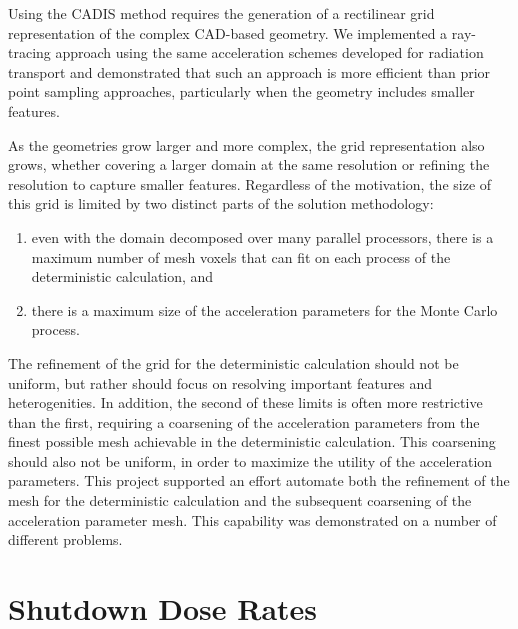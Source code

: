 Using the \gls{CADIS} method requires the generation of a rectilinear grid
representation of the complex \gls{CAD}-based geometry.  We implemented a
ray-tracing approach using the same acceleration schemes developed for
radiation transport and demonstrated that such an approach is more efficient
than prior point sampling approaches, particularly when the geometry includes
smaller features.

As the geometries grow larger and more complex, the grid representation also
grows, whether covering a larger domain at the same resolution or refining the
resolution to capture smaller features.  Regardless of the motivation, the
size of this grid is limited by two distinct parts of the solution
methodology:
\begin{enumerate}
\item even with the domain decomposed over many parallel processors, there is
  a maximum number of mesh voxels that can fit on each process of the
  deterministic calculation, and
\item there is a maximum size of the acceleration parameters for the Monte Carlo process.
\end{enumerate}
The refinement of the grid for the deterministic calculation should not be
uniform, but rather should focus on resolving important features and
heterogenities.  In addition, the second of these limits is often more
restrictive than the first, requiring a coarsening of the acceleration
parameters from the finest possible mesh achievable in the deterministic
calculation.  This coarsening should also not be uniform, in order to maximize
the utility of the acceleration parameters.  This project supported an effort
automate both the refinement of the mesh for the deterministic calculation and
the subsequent coarsening of the acceleration parameter mesh.  This capability
was demonstrated on a number of different problems.

\section{Shutdown Dose Rates}

